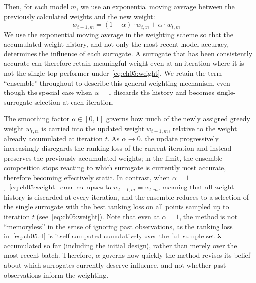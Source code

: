 Then, for each model $m$, we use an exponential moving average between the previously calculated weights and the new weight:
\begin{equation}
    \bar{w}_{t+1,m} = (1-\alpha) \cdot \bar{w}_{t, m} + \alpha  \cdot {w}_{t,m} \; .
    \label{eq:ch05:weight_ema}
\end{equation}
We use the exponential moving average in the weighting scheme so that the accumulated weight history, and not only the most recent model accuracy, determines the influence of each surrogate.
A surrogate that has been consistently accurate can therefore retain meaningful weight even at an iteration where it is not the single top performer under~\cref{eq:ch05:weight}. We retain the term ``ensemble'' throughout to describe this general weighting mechanism, even though the special case when $\alpha = 1$ discards the history and becomes single-surrogate selection at each iteration.

The smoothing factor $\alpha \in [0,1]$ governs how much of the newly assigned greedy weight ${w}_{t,m}$ is carried into the updated weight $\bar{w}_{t+1,m}$, relative to the weight already accumulated at iteration $t$. 
As $\alpha \to 0$, the update 
progressively increasingly 
disregards the ranking loss of the current iteration and instead preserves the previously accumulated weights; in the limit, the ensemble composition stops reacting to which surrogate is currently most accurate, therefore becoming effectively static. 
In contrast, when $\alpha = 1$,~\cref{eq:ch05:weight_ema} collapses to $\bar{w}_{t+1,m} = {w}_{t,m}$, meaning that all weight history is discarded at every iteration, and the ensemble reduces to a selection of the single surrogate with the best ranking loss on all points sampled up to iteration $t$ (see~\cref{eq:ch05:weight}).
Note that even at $\alpha = 1$, the method is not ``memoryless'' in the sense of ignoring past observations, as the ranking loss in~\cref{eq:ch05:rl} is itself computed cumulatively over the full sample set $\boldsymbol{\lambda}$ accumulated so far (including the initial design), rather than merely over the most recent batch. 
Therefore, $\alpha$ governs how quickly the method revises its belief about which surrogates currently deserve influence, and not whether past observations inform the weighting. 

